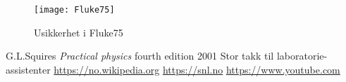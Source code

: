 \documentclass[norsk,a4paper,12pt]{article}
\begin{document}
\begin{figure}
\caption{Usikkerhet i Fluke75} 
\texttt{[image: Fluke75]} 	
\label{F75}
\end{figure}

\begin{thebibliography}{}
	G.L.Squires
	\textit{Practical physics}
	fourth edition
	2001
	Stor takk til laboratorie-assistenter
	\url{https://no.wikipedia.org}
	\url{https://snl.no}
	\url{https://www.youtube.com}\\
\end{thebibliography}
\end{document}
